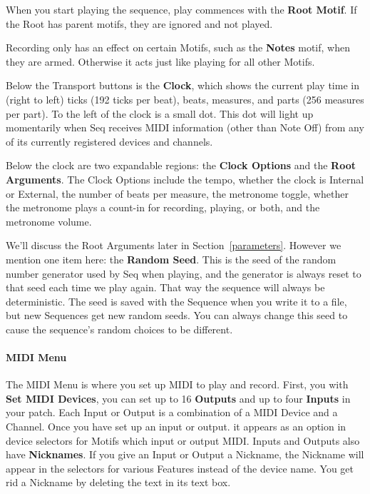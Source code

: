 \documentclass[twoside,10pt]{article}
\begin{document}
When you start playing the sequence, play commences with the {\bf Root Motif}.  If the Root has parent motifs, they are ignored and not played.  

Recording only has an effect on certain Motifs, such as the {\bf Notes} motif, when they are armed.  Otherwise it acts just like playing for all other Motifs.

Below the Transport buttons is the {\bf Clock}, which shows the current play time in (right to left) ticks (192 ticks per beat), beats, measures, and parts (256 measures per part).  To the left of the clock is a small dot.  This dot will light up momentarily when Seq receives MIDI information (other than Note Off) from any of its currently registered devices and channels.

Below the clock are two expandable regions: the {\bf Clock Options} and the {\bf Root Arguments}.  The Clock Options include the tempo, whether the clock is Internal or External, the number of beats per measure, the metronome toggle, whether the metronome plays a count-in for recording, playing, or both, and the metronome volume.

We'll discuss the Root Arguments later in Section~\ref{parameters}.  However we mention one item here: the {\bf Random Seed}.  This is the seed of the random number generator used by Seq when playing, and the generator is always reset to that seed each time we play again.  That way the sequence will always be deterministic.  The seed is saved with the Sequence when you write it to a file, but new Sequences get new random seeds. You can always change this seed to cause the sequence's random choices to be different.

\paragraph{MIDI Menu}

The MIDI Menu is where you set up MIDI to play and record.  First, you with {\bf Set MIDI Devices}, you can set up to 16 {\bf Outputs} and up to four {\bf Inputs} in your patch.  Each Input or Output is a combination of a MIDI Device and a Channel.  Once you have set up an input or output. it appears as an option in device selectors for Motifs which input or output MIDI.  
Inputs and Outputs also have {\bf Nicknames}.  If you give an Input or Output a Nickname, the Nickname will appear in the selectors for various Features instead of the device name.  You get rid a Nickname by deleting the text in its text box.
\end{document}
